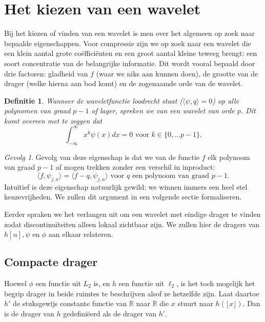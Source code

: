 \documentclass[11pt]{report}
\newcommand{\R}{\mathbb{R}}
\theoremstyle{plain}
\newtheorem*{definitie}{Definitie}
\theoremstyle{remark}
\newtheorem*{gevolg}{Gevolg}
\begin{document}
\section{Het kiezen van een wavelet}
Bij het kiezen of vinden van een wavelet is men over het algemeen op zoek naar bepaalde eigenschappen. Voor compressie zijn we op zoek naar een wavelet die een klein aantal grote co\"effici\"enten en een groot aantal kleine teweeg brengt: een soort concentratie van de belangrijke informatie. Dit wordt vooral bepaald door drie factoren: gladheid van $f$ (waar we niks aan kunnen doen), de grootte van de drager (welke hierna aan bod komt) en de zogenaamde orde van de wavelet.

\begin{definitie}
Wanneer de waveletfunctie loodrecht staat ($\langle \psi, q\rangle = 0$) op alle polynomen van graad $p-1$ of lager, spreken we van een wavelet van orde $p$. Dit komt overeen met te zeggen dat
\[
	\int_{-\infty}^\infty x^k \psi(x) dx = 0 \text{ voor } k \in \{ 0, \ldots p-1 \}.
\]
\end{definitie}

\begin{gevolg}
Gevolg van deze eigenschap is dat we van de functie $f$ elk polynoom van graad $p-1$ af mogen trekken zonder een verschil in inproduct:
\[
	\langle f, \psi_{j,n} \rangle = \langle f - q, \psi_{j,n} \rangle \text{ voor $q$ een polynoom van graad $p-1$}. 
\]
Intu\"itief is deze eigenschap natuurlijk gewild: we winnen immers een heel stel keuzevrijheden. We zullen dit argument in een volgende sectie formaliseren.
\end{gevolg}

Eerder spraken we het verlangen uit om een wavelet met eindige drager te vinden zodat discontinu\"iteiten alleen lokaal zichtbaar zijn. We zullen hier de dragers van $h[n], \psi$ en $\phi$ aan elkaar relateren.

\subsection{Compacte drager} 
Hoewel $\phi$ een functie uit $L_2$ is, en $h$ een functie uit $\ell_2$, is het toch mogelijk het begrip drager in beide ruimtes te beschrijven alsof ze hetzelfde zijn. Laat daartoe $h'$ de stuksgewijs constante functie van $\R$ naar $\R$ die $x$ stuurt naar $h(\lfloor x \rfloor)$. Dan is de drager van $h$ gedefini\"eerd als de drager van $h'$.
\end{document}
